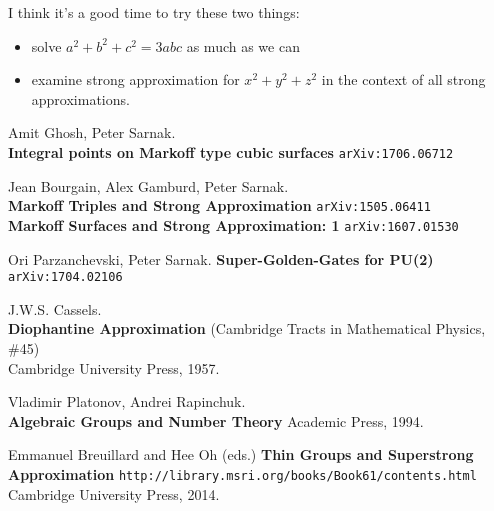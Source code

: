 \documentclass[12pt]{article}
\begin{document}
\noindent I think it's a good time to try these two things:
\begin{itemize}
\item solve $ a^2 + b^2 + c^2  = 3abc $ as much as we can
\item examine strong approximation for $x^2 + y^2 + z^2$ in the context of all strong approximations.
\end{itemize}

\vfill



\begin{thebibliography}{}

\item Amit Ghosh, Peter Sarnak. \\ 
\textbf{Integral points on Markoff type cubic surfaces} \texttt{arXiv:1706.06712}

\item Jean Bourgain, Alex Gamburd, Peter Sarnak. \\
\textbf{Markoff Triples and Strong Approximation} \hspace{30pt}\texttt{arXiv:1505.06411} \\
\textbf{Markoff Surfaces and Strong Approximation: 1} \texttt{arXiv:1607.01530}

\item Ori Parzanchevski, Peter Sarnak. \textbf{Super-Golden-Gates for PU(2)} \texttt{arXiv:1704.02106}

\item J.W.S. Cassels. \\ \textbf{Diophantine Approximation} (Cambridge Tracts in Mathematical Physics, \#45) \\ Cambridge University Press, 1957. 

\item Vladimir Platonov, Andrei Rapinchuk. \\ \textbf{Algebraic Groups and Number Theory}
Academic Press, 1994.

\item Emmanuel Breuillard and Hee Oh (eds.) \textbf{Thin Groups and Superstrong Approximation} 
\texttt{http://library.msri.org/books/Book61/contents.html} Cambridge University Press, 2014.
\end{thebibliography}
\end{document}
